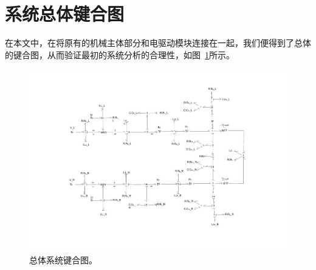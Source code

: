 \clearpage
\section{系统总体键合图}

在本文中，在将原有的机械主体部分和电驱动模块连接在一起，我们便得到了总体的键合图，从而验证最初的系统分析的合理性，如图~\ref{fig:overall}所示。

\begin{figure}[!h]
	\centering
	\includegraphics[width=1.25\textwidth,angle=90]{fig/overall.pdf}
	\caption{总体系统键合图。}\label{fig:overall}
\end{figure}
